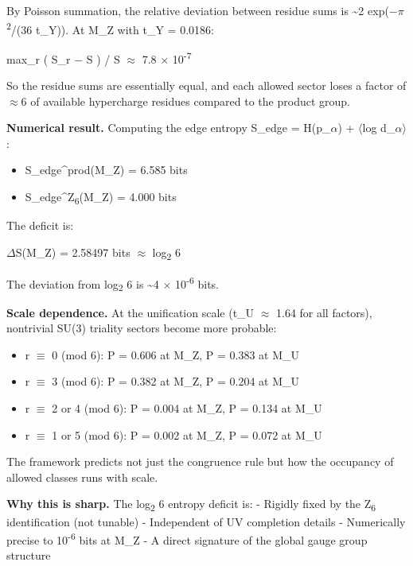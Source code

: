 \documentclass[11pt,a4paper]{article}
\theoremstyle{remark}
\providecommand{\tightlist}{%
  \setlength{\itemsep}{0pt}\setlength{\parskip}{0pt}}
\begin{document}
By Poisson summation, the relative deviation between residue sums is \textasciitilde2 exp(\ensuremath{-}\ensuremath{\pi}\textsuperscript{2}/(36 t\_Y)). At M\_Z with t\_Y = 0.0186:

max\_r \textbar( S\_r \ensuremath{-} S ) / S\textbar{} \ensuremath{\approx} 7.8 \ensuremath{\times} 10\textsuperscript{-7}

So the residue sums are essentially equal, and each allowed sector loses a factor of \ensuremath{\approx}6 of available hypercharge residues compared to the product group.

\textbf{Numerical result.} Computing the edge entropy S\_edge = H(p\_\ensuremath{\alpha}) + \ensuremath{\langle}log d\_\ensuremath{\alpha}\ensuremath{\rangle}:

\begin{itemize}
\tightlist
\item
  S\_edge\^{}prod(M\_Z) = 6.585 bits
\item
  S\_edge\^{}Z\textsubscript{6}(M\_Z) = 4.000 bits
\end{itemize}

The deficit is:

\ensuremath{\Delta}S(M\_Z) = 2.58497 bits \ensuremath{\approx} log\textsubscript{2} 6

The deviation from log\textsubscript{2} 6 is \textasciitilde4 \ensuremath{\times} 10\textsuperscript{-6} bits.

\textbf{Scale dependence.} At the unification scale (t\_U \ensuremath{\approx} 1.64 for all
factors), nontrivial SU(3) triality sectors become more probable:

\begin{itemize}
\tightlist
\item
  r \ensuremath{\equiv} 0 (mod 6): P = 0.606 at M\_Z, P = 0.383 at M\_U
\item
  r \ensuremath{\equiv} 3 (mod 6): P = 0.382 at M\_Z, P = 0.204 at M\_U
\item
  r \ensuremath{\equiv} 2 or 4 (mod 6): P = 0.004 at M\_Z, P = 0.134 at M\_U
\item
  r \ensuremath{\equiv} 1 or 5 (mod 6): P = 0.002 at M\_Z, P = 0.072 at M\_U
\end{itemize}

The framework predicts not just the congruence rule but how the occupancy
of allowed classes runs with scale.

\textbf{Why this is sharp.} The log\textsubscript{2} 6 entropy deficit is:
- Rigidly fixed by the Z\textsubscript{6} identification (not tunable)
- Independent of UV completion details
- Numerically precise to 10\textsuperscript{-6} bits at M\_Z
- A direct signature of the global gauge group structure
\end{document}
